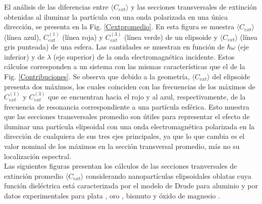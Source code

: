 El análisis de las diferencias entre $\langle C_{ext}\rangle$ y  las secciones transversales de extinción obtenidas al iluminar la partícula con una onda polarizada en una única dirección, se presenta en la Fig. \ref{Cextpromedio}. En esta figura se muestra $\langle C_{ext}\rangle$ (línea azul), $C_{ext}^{(1)}$ (línea roja) y $C_{ext}^{(3)}$ (línea verde) de un elipsoide y  $\langle C_{ext}\rangle$ (línea gris punteada) de una esfera. Las cantidades se muestran en función de $\hbar\omega$ (eje inferior) y de $\lambda$ (eje superior) de la onda electromagnética incidente. Estos cálculos corresponden a un sistema con las mismas características que el de la Fig. \ref{Contribuciones}. Se observa que debido a la geometría,
$\langle C_{ext}\rangle$ del elipsoide presenta dos máximos, los cuales coinciden con las frecuencias de los máximos de $C_{ext}^{(1)}$ y $C_{ext}^{(3)}$ que se encuentran hacia el rojo y al azul, respectivamente, de la frecuencia de resonancia correspondiente a una partícula esférica. Esto muestra que las secciones transversales promedio son útiles para representar el efecto de iluminar una partícula elipsoidal con una onda electromagnética polarizada en la dirección de cualquiera de sus tres ejes principales, ya que lo que cambia es el valor nominal de los máximos en la sección transversal promedio, más no su localización espectral. \\

Las siguientes figuras presentan los cálculos de las secciones tranversales de extinción promedio  $\langle C_{ext}\rangle$ considerando nanopartículas elipsoidales oblatas cuya función dieléctrica está caracterizada por el modelo de Drude para aluminio \cite{Aluminio} y por datos experimentales para plata \cite{Plata}, oro \cite{Plata}, bismuto \cite{Bismuto} y  óxido de magnesio \cite{MgO}.


